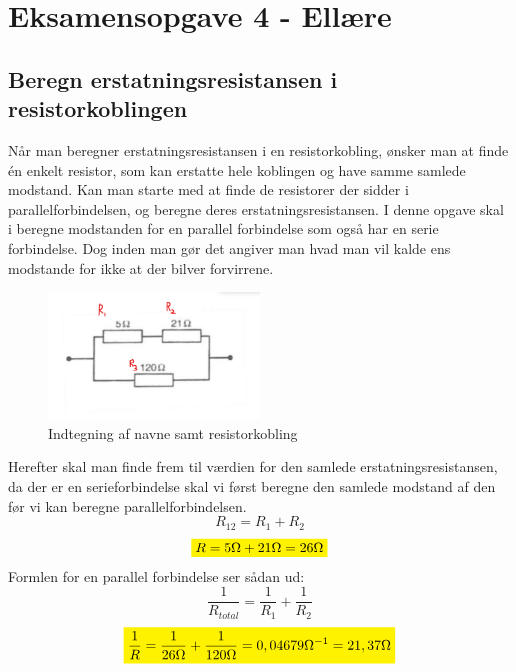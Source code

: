 \newpage
\section{Eksamensopgave 4 - Ellære}
\subsection{Beregn erstatningsresistansen i resistorkoblingen}
Når man beregner erstatningsresistansen i en resistorkobling, ønsker man at finde én enkelt resistor, som kan erstatte hele koblingen og have samme samlede modstand. Kan man starte med at finde de resistorer der sidder i parallelforbindelsen, og beregne deres erstatningsresistansen. 
I denne opgave skal i beregne modstanden for en parallel forbindelse som også har en serie forbindelse. Dog inden man gør det angiver man hvad man vil kalde ens modstande for ikke at der bilver forvirrene.\newline
\begin{figure}[h!]
    \centering
    \includegraphics[width=0.5\textwidth]{figures/resistans.png}
    \caption{Indtegning af navne samt resistorkobling}
\end{figure}
\newline
Herefter skal man finde frem til værdien for den samlede erstatningsresistansen, da der er en serieforbindelse skal vi først beregne den samlede modstand af den før vi kan beregne parallelforbindelsen.
\begin{equation*}
    R_{12}=R_{1}+R_{2}
\end{equation*}
\begin{equation*}
    \mathcolorbox{yellow}{R=5\Omega+21\Omega=26\Omega}
\end{equation*}
Formlen for en parallel forbindelse ser sådan ud:
\begin{equation*}
    \frac{1}{R_{total}}=\frac{1}{R_{1}}+\frac{1}{R_{2}}
\end{equation*}
\begin{equation*}
    \mathcolorbox{yellow}{\frac{1}{R}=\frac{1}{26\Omega}+\frac{1}{120\Omega}=0,04679\Omega^{-1}=21,37\Omega}
\end{equation*}

